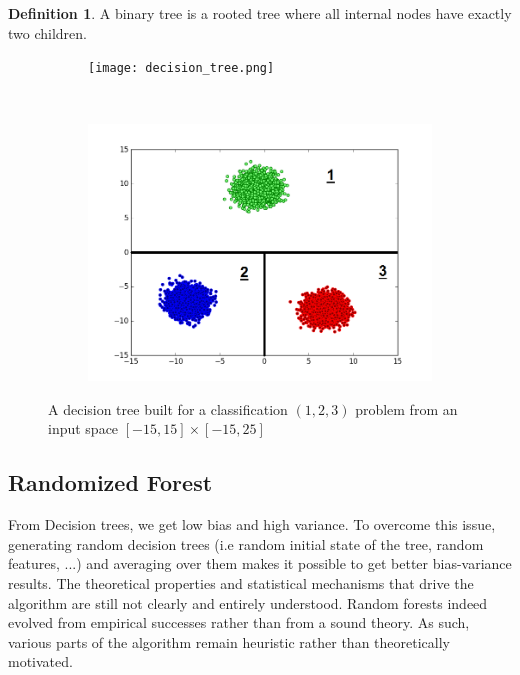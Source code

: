 \documentclass[english,11pt,openany]{article}
\theoremstyle{definition}
\newtheorem{defn}{Definition}[section]
\theoremstyle{plain}
\theoremstyle{definition}
\begin{document}
\begin{appendices}
		\begin{defn}
			A binary tree is a rooted tree where all internal nodes have
			exactly two children.
		\end{defn}
		
		
		\newpage 
		\begin{figure}[t!]
			\centering
			\begin{subfigure}[t]{0.3\textwidth}
				\texttt{[image: decision\_tree.png]}
				\caption{}
				\label{fig:gull1} %
			\end{subfigure}
			~~~~~~~~~~~~~~~
			\begin{subfigure}[t]{0.3\textwidth}
				\includegraphics[width=\textwidth]{classification_presentation.png}
				\caption{}
				\label{fig:gull}
			\end{subfigure}
			\caption{A decision tree built for a classification $(1, 2, 3)$ problem from an input space $[-15, 15] \times [-15, 25]$}
		\end{figure}
		
		
		\subsection{Randomized Forest}
		
		From Decision trees, we get low bias and high variance. To overcome this issue, generating random decision trees (i.e random initial state of the tree, random features, ...) and averaging over them makes it possible to get better bias-variance results. 
		The theoretical properties and statistical mechanisms that drive the algorithm are still not clearly and entirely understood.
		Random forests indeed evolved from empirical successes rather
		than from a sound theory. As such, various parts of the algorithm remain heuristic rather than theoretically motivated. 
		

\end{appendices}
\end{document}
